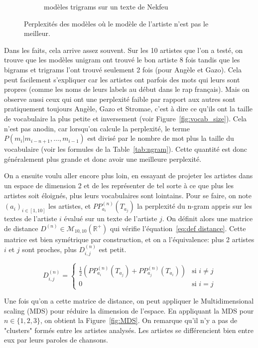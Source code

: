 \documentclass[a4paper]{article}
\begin{document}
\begin{figure}[!ht]
\begin{subfigure}{0.32\textwidth}
        \caption{modèles trigrams sur un texte de Nekfeu}
    \end{subfigure}
    \hfill
    \caption{Perplexités des modèles où le modèle de l'artiste n'est pas le meilleur.}
    \label{fig:paternite}
\end{figure}

Dans les faits, cela arrive assez souvent. Sur les 10 artistes que l'on a testé, on trouve que les modèles
unigram ont trouvé le bon artiste 8 fois tandis que les bigrams et trigrams l'ont trouvé seulement 2 fois (pour Angèle et Gazo).
Cela peut facilement s'expliquer car les artistes ont parfois des mots qui leurs sont propres (comme 
les noms de leurs labels au début dans le rap français). Mais on observe aussi ceux qui ont une perplexité faible
par rapport aux autres sont pratiquement toujours Angèle, Gazo et Stromae, c'est à dire ce qu'ils ont la taille de 
vocabulaire la plus petite et inversement (voir Figure~\ref{fig:vocab_size}). Cela n'est pas anodin, car 
lorsqu'on calcule la perplexité, le terme $P(m_i|m_{i-n+1},\dots,m_{i-1})$ est divisé par le nombre de mot plus la taille du 
vocabulaire (voir les formules de la Table~\ref{tab:ngram}). Cette quantité est donc généralement plus grande et donc avoir une meilleure perplexité.

On a ensuite voulu aller encore plus loin, en essayant de projeter les artistes dans un espace de dimension 2 et de les représenter de tel
sorte à ce que plus les artistes soit éloignés, plus leurs vocabulaires sont lointains. Pour se faire, on note $(a_i)_{i \in [1, 10]}$ les artistes,
et $PP_{a_i}^{(n)}(T_{a_j})$ la perplexité du n-gram appris sur les textes de l'artiste $i$ évalué sur un texte de l'artiste $j$.
On définit alors une matrice de distance $D^{(n)} \in \mathcal{M}_{10, 10}(\mathbb{R^+})$ qui vérifie l'équation~\ref{eq:def distance}. Cette matrice
est bien symétrique par construction, et on a l'équivalence: plus 2 artistes $i$ et $j$ sont proches, plus $D_{i,j}^{(n)}$ est petit.

\begin{equation}
    D_{i,j}^{(n)} =
    \begin{cases}
    \frac{1}{2}(PP_{a_i}^{(n)}(T_{a_j}) + PP_{a_j}^{(n)}(T_{a_i}))& \text{si } i \neq j \\
    0 & \text{si } i = j
    \end{cases}
    \label{eq:def distance}
\end{equation}

Une fois qu'on a cette matrice de distance, on peut appliquer le Multidimensional scaling (MDS) pour réduire la dimension de l'espace.
En appliquant la MDS pour $n \in \{1, 2, 3\}$, on obtient la Figure~\ref{fig:MDS}. On remarque qu'il n'y a pas de "clusters" formés entre les artistes analysés. Les artistes se différencient bien entre eux par leurs paroles de chansons. 
\end{document}
